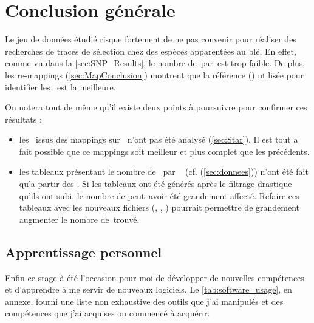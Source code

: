 \documentclass[../main]{subfiles} %
\begin{document}
\addto\extrasfrench{\protected\edef:{\unexpanded\expandafter{:}}}

\section{Conclusion générale}

Le jeu de données étudié risque fortement de ne pas convenir pour réaliser des recherches de traces de sélection chez des espèces apparentées au blé. En effet, comme vu dans la \cref{sec:SNP_Results}, le nombre de \SNP\,par \contigs\,est trop faible. De plus, les re-\glspl{mapping} (\cref{sec:MapConclusion}) montrent que la référence (\TrEx) utilisée pour identifier les  \SNP est la meilleure. 

On notera tout de même qu'il existe deux points à poursuivre pour confirmer ces résultats :

\begin{itemize}
    \item les \bam issus des \glspl{mapping} sur \GeMo n'ont pas été analysé (\cref{sec:Star}). Il est tout a fait possible que ce \glspl{mapping} soit meilleur et plus complet que les précédents.

    \item les tableaux présentant le nombre de \SNP par \contigs  (cf. (\cref{sec:donnees})) n'ont été fait qu'a partir des \OldBam. Si les tableaux ont été générés après le filtrage drastique qu'ils ont subi, le nombre de \SNP peut avoir été grandement affecté. Refaire ces tableaux avec les nouveaux fichiers (\BamGeStar, \BamTrEx, \BamTrMo) pourrait permettre de grandement augmenter le nombre de \SNP\,trouvé.
\end{itemize}

\subsection{Apprentissage personnel}
Enfin ce stage à été l'occasion pour moi de développer de nouvelles compétences et d'apprendre à me servir de nouveaux logiciels. Le \cref{tab:software_usage}, en annexe, fourni une liste non exhaustive des outils que j'ai manipulés et des compétences que j'ai acquises ou commencé à acquérir.






\end{document}
